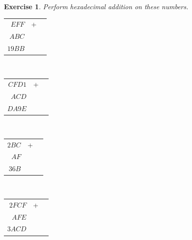 \documentclass[12pt, a4paper]{report}
\newtheorem{exercise}{Exercise}
\begin{document}
	\begin{exercise}
		Perform hexadecimal addition on these numbers.
	\end{exercise}
	
	\begin{center}
		\begin{multicols}{2}
			\begin{tabular}{rll}
				$EFF$  & + &   \\
				$ABC$  &   &   \\ \cline{1-1}
				$19BB$ &   &   
			\end{tabular}\\
			\bigskip
			\bigskip
			\begin{tabular}{rll}
				$CFD1$ & + &   \\
				$ACD$  &   &   \\ \cline{1-1}
				$DA9E$ &   &   
			\end{tabular}\\
			\bigskip
			\bigskip
			\begin{tabular}{rll}
				$2BC$ & + &   \\
				$AF$  &   &   \\ \cline{1-1}
				$36B$ &   &   
			\end{tabular}\\
			\bigskip
			\bigskip
			\begin{tabular}{rll}
				$2FCF$ & + &   \\
				$AFE$  &   &   \\ \cline{1-1}
				$3ACD$ &   &   
			\end{tabular}\\
		\end{multicols}
	\end{center}
	
\end{document}
